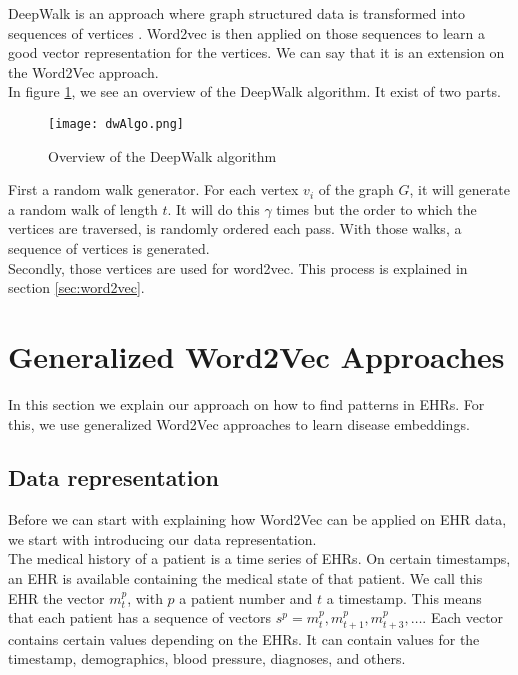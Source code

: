 DeepWalk is an approach where graph structured data is transformed into sequences of vertices \cite{deepwalkMain:article}. Word2vec is then applied on those sequences to learn a good vector representation for the vertices. We can say that it is an extension on the Word2Vec approach. \\

In figure \ref{fig:dwAlgo}, we see an overview of the DeepWalk algorithm. It exist of two parts. 

\begin{figure}[htbp]
	\centering
	\texttt{[image: dwAlgo.png]}
	\caption{Overview of the DeepWalk algorithm \cite{deepwalkMain:article}}
	\label{fig:dwAlgo}
\end{figure} 

First a random walk generator. For each vertex $v_i$ of the graph $G$, it will generate a random walk of length $t$. It will do this $\gamma$ times but the order to which the vertices are traversed, is randomly ordered each pass. With those walks, a sequence of vertices is generated. \\
Secondly, those vertices are used for word2vec. This process is explained in section \ref{sec:word2vec}.


\section{Generalized Word2Vec Approaches}
\label{sec:gw2v}

In this section we explain our approach on how to find patterns in EHRs. For this, we use generalized Word2Vec approaches to learn disease embeddings. 

\subsection{Data representation}

Before we can start with explaining how Word2Vec can be applied on EHR data, we start with introducing our data representation. \\
The medical history of a patient is a time series of EHRs. On certain timestamps, an EHR is available containing the medical state of that patient. We call this EHR the vector $m^p_t$, with $p$ a patient number and $t$ a timestamp. This means that each patient has a sequence of vectors $s^p = m^p_t, m^p_{t+1}, m^p_{t+3}, \ldots$. Each vector contains certain values depending on the EHRs. It can contain values for the timestamp, demographics, blood pressure, diagnoses, and others. 


